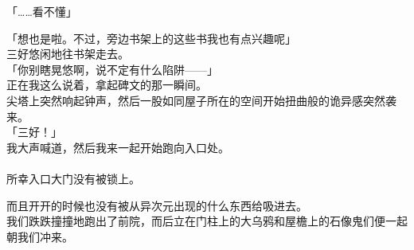 「……看不懂」

「想也是啦。不过，旁边书架上的这些书我也有点兴趣呢」\\

三好悠闲地往书架走去。\\

「你别瞎晃悠啊，说不定有什么陷阱——」\\

正在我这么说着，拿起碑文的那一瞬间。\\

尖塔上突然响起钟声，然后一股如同屋子所在的空间开始扭曲般的诡异感突然袭来。\\

「三好！」\\

我大声喊道，然后我来一起开始跑向入口处。\\

\sqsplit\\

所幸入口大门没有被锁上。

而且开开的时候也没有被从异次元出现的什么东西给吸进去。\\

我们跌跌撞撞地跑出了前院，而后立在门柱上的大乌鸦和屋檐上的石像鬼们便一起朝我们冲来。

